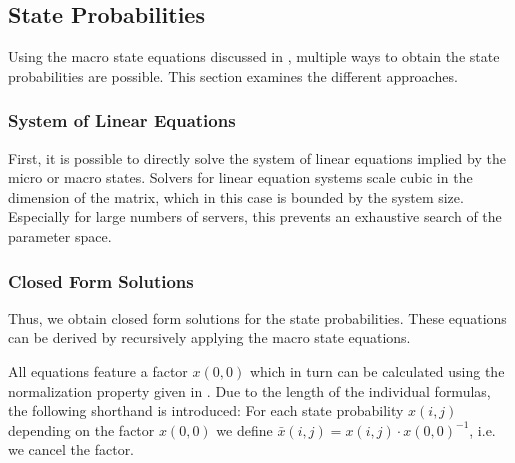 \subsection{State Probabilities}\label{sec:cloud:data_centers:closed_form_solution}
Using the macro state equations discussed in , multiple ways to obtain the state probabilities are possible.
This section examines the different approaches.

\subsubsection*{System of Linear Equations}
First, it is possible to directly solve the system of linear equations implied by the micro or macro states.
Solvers for linear equation systems scale cubic in the dimension of the matrix, which in this case is bounded by the system size.
Especially for large numbers of servers, this prevents an exhaustive search of the parameter space.

\subsubsection*{Closed Form Solutions}
Thus, we obtain closed form solutions for the state probabilities.
These equations can be derived by recursively applying the macro state equations.

All equations feature a factor \(x(0, 0)\) which in turn can be calculated using the normalization property given in .
Due to the length of the individual formulas, the following shorthand is introduced:
For each state probability \(x(i, j)\) depending on the factor \(x(0,0)\) we define \(\bar{x}(i, j) = x(i, j) \cdot x(0, 0)^{-1}\), i.e. we cancel the factor.

